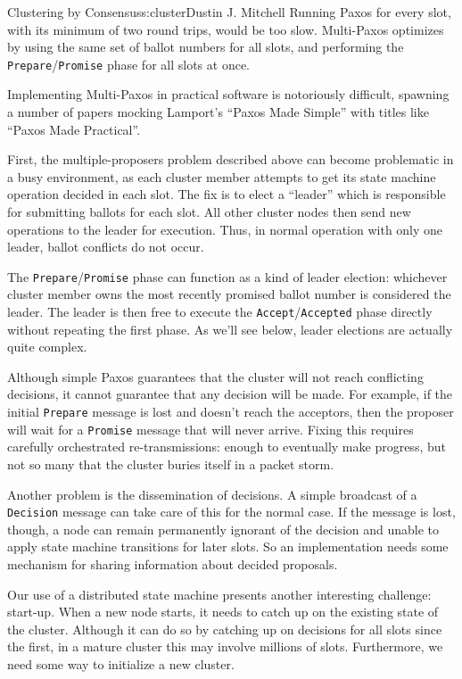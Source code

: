 \begin{aosachapter}{Clustering by Consensus}{s:cluster}{Dustin J. Mitchell}
Running Paxos for every slot, with its minimum of two round trips, would
be too slow. Multi-Paxos optimizes by using the same set of ballot
numbers for all slots, and performing the
\texttt{Prepare}/\texttt{Promise} phase for all slots at once.

\label{paxos-made-pretty-hard}

Implementing Multi-Paxos in practical software is notoriously difficult,
spawning a number of papers mocking Lamport's ``Paxos Made Simple'' with
titles like ``Paxos Made Practical''.

First, the multiple-proposers problem described above can become
problematic in a busy environment, as each cluster member attempts to
get its state machine operation decided in each slot. The fix is to
elect a ``leader'' which is responsible for submitting ballots for each
slot. All other cluster nodes then send new operations to the leader for
execution. Thus, in normal operation with only one leader, ballot
conflicts do not occur.

The \texttt{Prepare}/\texttt{Promise} phase can function as a kind of
leader election: whichever cluster member owns the most recently
promised ballot number is considered the leader. The leader is then free
to execute the \texttt{Accept}/\texttt{Accepted} phase directly without
repeating the first phase. As we'll see below, leader elections are
actually quite complex.

Although simple Paxos guarantees that the cluster will not reach
conflicting decisions, it cannot guarantee that any decision will be
made. For example, if the initial \texttt{Prepare} message is lost and
doesn't reach the acceptors, then the proposer will wait for a
\texttt{Promise} message that will never arrive. Fixing this requires
carefully orchestrated re-transmissions: enough to eventually make
progress, but not so many that the cluster buries itself in a packet
storm.

Another problem is the dissemination of decisions. A simple broadcast of
a \texttt{Decision} message can take care of this for the normal case.
If the message is lost, though, a node can remain permanently ignorant
of the decision and unable to apply state machine transitions for later
slots. So an implementation needs some mechanism for sharing information
about decided proposals.

Our use of a distributed state machine presents another interesting
challenge: start-up. When a new node starts, it needs to catch up on the
existing state of the cluster. Although it can do so by catching up on
decisions for all slots since the first, in a mature cluster this may
involve millions of slots. Furthermore, we need some way to initialize a
new cluster.


\end{aosachapter}
